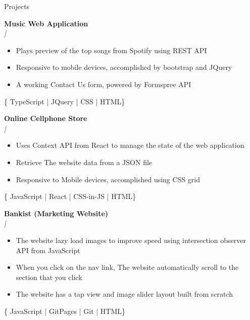 \documentclass{resume} %
\newcommand{\sepspace}{\vspace*{1em}}           %
\begin{document}
\begin{rSection}{Projects}

        \textbf{Music Web Application} \\
        \textit{ |  }
        \begin{itemize}[noitemsep,topsep=-6pt]
          \item Plays preview of the top songs from Spotify using REST API
          \item Responsive to mobile devices, accomplished by bootstrap and JQuery
          \item A working Contact Us form, powered by Formspree API
        \end{itemize}
        \{ TypeScript | JQuery | CSS | HTML\}

        \textbf{Online Cellphone Store} \\
        \textit{ |  }
        \begin{itemize}[noitemsep,topsep=-6pt]
          \item Uses Context API from React to manage the state of the web application
          \item Retrieve The website data from a JSON file
          \item Responsive to Mobile devices, accomplished using CSS grid
        \end{itemize}
        \{ JavaScript | React | CSS-in-JS | HTML\}

        \textbf{Bankist (Marketing Website)} \\
        \textit{ |  }
        \begin{itemize}[noitemsep,topsep=-6pt]
          \item The website lazy load images to improve speed using intersection observer API from JavaScript
          \item When you click on the nav link, The website automatically scroll to the section that you click
          \item The website has a tap view and image slider layout built from scratch
        \end{itemize}
        \{ JavaScript | GitPages | Git | HTML\}



\end{rSection}
\end{document}
